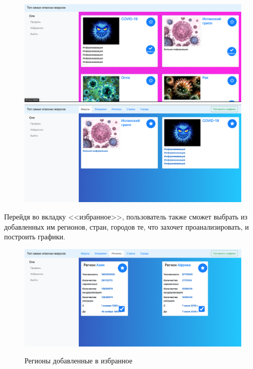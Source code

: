 \documentclass[a4paper,14pt]{extarticle}
\begin{document}
 	\begin{figure}[h!]
 		\begin{minipage}[b]{0.45\textwidth}
 			\includegraphics[width=\textwidth]{examples/stars.png}
 		\end{minipage}
 		\begin{minipage}[b]{0.55\textwidth}
 			\includegraphics[width=\textwidth]{examples/favourties.png}
 		\end{minipage}
 		\label{ris:stars_favourites}
 	\end{figure}
 
 	\newpage
 	
 	Перейдя во вкладку <<избранное>>, пользователь также сможет выбрать из добавленных им регионов, стран, городов те, что захочет проанализировать, и построить графики.
 	
 	\begin{figure}[h!]
 		\begin{center}
 			{\includegraphics[width = \textwidth]{examples/favourite_regions.png}}
 			\caption{Регионы добавленные в избранное}
 			\label{ris:favourite_regions}
 		\end{center}
 	\end{figure}
 	
\end{document}
